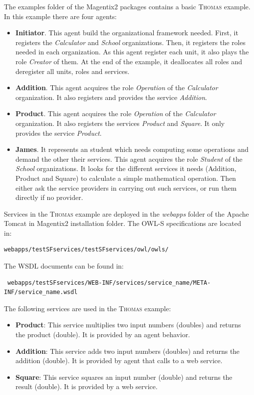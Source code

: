 The examples folder of the Magentix2 packages contains a basic \textsc{Thomas} example. In this example there are four agents:
\begin{itemize}
 \item \textbf{Initiator}. This agent build the organizational framework needed. First, it registers the \textit{Calculator} and \textit{School} organizations. Then, it registers the roles needed in each organization. As this agent register each unit, it also plays the role \textit{Creator} of them. At the end of the example, it deallocates all roles and deregister all units, roles and services.
 \item \textbf{Addition}. This agent acquires the role \textit{Operation} of the \textit{Calculator} organization. It also registers and provides the service \textit{Addition}.
 \item \textbf{Product}. This agent acquires the role \textit{Operation} of the \textit{Calculator} organization. It also registers the services \textit{Product} and \textit{Square}. It only provides the service \textit{Product}.
 \item \textbf{James}. It represents an student which needs computing some operations and demand the other their services. This agent acquires the role \textit{Student} of the \textit{School} organizations. It looks for the different services it needs (Addition, Product and Square) to calculate a simple mathematical operation. Then either ask the service providers in carrying out such services, or run them directly if no provider.
\end{itemize}

Services in the \textsc{Thomas} example are deployed in the \textit{webapps} folder of the Apache Tomcat in Magentix2 installation folder. The OWL-S specifications are located in:
\begin{lstlisting}
webapps/testSFservices/testSFservices/owl/owls/
\end{lstlisting}
The WSDL documents can be found in:
\begin{lstlisting}
 webapps/testSFservices/WEB-INF/services/service_name/META-INF/service_name.wsdl
\end{lstlisting}

The following services are used in the \textsc{Thomas} example:
\begin{itemize}
 \item \textbf{Product}: This service multiplies two input numbers (doubles) and returns the product (double). It is provided by an agent behavior.
 \item \textbf{Addition}: This service adds two input numbers (doubles) and returns the addition (double). It is provided by agent that calls to a web service.
 \item \textbf{Square}: This service squares an input number (double) and returns the result (double). It is provided by a web service.
\end{itemize}

